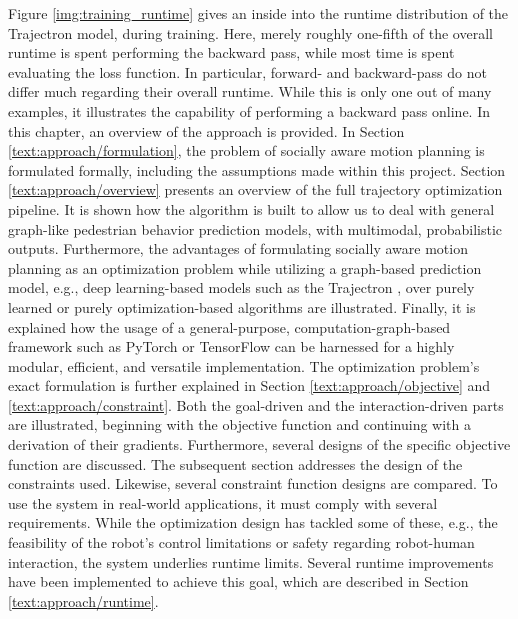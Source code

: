 Figure \ref{img:training_runtime} gives an inside into the runtime distribution of the Trajectron model, during training. Here, merely roughly one-fifth of the overall runtime is spent performing the backward pass, while most time is spent evaluating the loss function. In particular, forward- and backward-pass do not differ much regarding their overall runtime. While this is only one out of many examples, it illustrates the capability of performing a backward pass online.  
\newline\newline
In this chapter, an overview of the approach is provided. In Section \ref{text:approach/formulation}, the problem of socially aware motion planning is formulated formally, including the assumptions made within this project. 
\newline
Section \ref{text:approach/overview} presents an overview of the full trajectory optimization pipeline. It is shown how the algorithm is built to allow us to deal with general graph-like pedestrian behavior prediction models, with multimodal, probabilistic outputs. Furthermore, the advantages of formulating socially aware motion planning as an optimization problem while utilizing a graph-based prediction model, e.g., deep learning-based models such as the Trajectron \cite{Ivanovic2018}, over purely learned \cite{Chen2017} or purely optimization-based \cite{Berg2011} algorithms are illustrated. Finally, it is explained how the usage of a general-purpose, computation-graph-based framework such as PyTorch \cite{pytorch} or TensorFlow \cite{tensorflow} can be harnessed for a highly modular, efficient, and versatile implementation.
\newline
The optimization problem's exact formulation is further explained in Section \ref{text:approach/objective} and \ref{text:approach/constraint}. Both the goal-driven and the interaction-driven parts are illustrated, beginning with the objective function and continuing with a derivation of their gradients. Furthermore, several designs of the specific objective function are discussed. The subsequent section addresses the design of the constraints used. Likewise, several constraint function designs are compared. 
\newline
To use the system in real-world applications, it must comply with several requirements. While the optimization design has tackled some of these, e.g., the feasibility of the robot's control limitations or safety regarding robot-human interaction, the system underlies runtime limits. Several runtime improvements have been implemented to achieve this goal, which are described in Section \ref{text:approach/runtime}.

